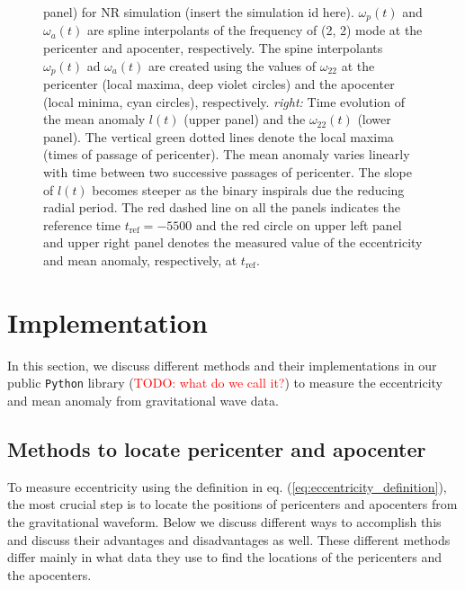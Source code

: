 \documentclass[aps,prd,amsmath,floats,floatfix, twocolumn,
superscriptaddress,nofootinbib,showpacs]{revtex4-1}
\newcommand{\red}{\textcolor{red}}
\newcommand{\TODO}[1]{\red{TODO: #1}}
\newcommand{\tref}{t_{\text{ref}}}
\begin{document}
\begin{figure}
{panel) for NR simulation (insert the simulation id here).
$\omega_p(t)$ and $\omega_a(t)$ are spline interpolants of the
frequency of (2, 2) mode at the pericenter and apocenter,
respectively. The spine interpolants $\omega_p(t)$ ad $\omega_a(t)$
are created using the values of $\omega_{22}$ at the pericenter (local
maxima, deep violet circles) and the apocenter (local minima, cyan
circles), respectively. {\itshape right:} Time evolution of the mean
anomaly $l(t)$ (upper panel) and the $\omega_{22}(t)$ (lower
panel). The vertical green dotted lines denote the local maxima (times
of passage of pericenter). The mean anomaly varies linearly with time
between two successive passages of pericenter. The slope of $l(t)$
becomes steeper as the binary inspirals due the reducing radial
period. The red dashed line on all the panels indicates the reference
time $\tref=-5500$ and the red circle on upper left panel and upper
right panel denotes the measured value of the eccentricity and mean
anomaly, respectively, at $\tref$.}
  \label{fig:ecc_definition}
\end{figure}

\section{Implementation}
\label{sec:implementation}
In this section, we discuss different methods and their
implementations in our public \texttt{Python} library (\TODO{what do
  we call it?}) to measure the eccentricity and mean anomaly from
gravitational wave data.

\subsection{Methods to locate pericenter and apocenter}
\label{sec:method-to-locate-pericenter-and-apocenter}
To measure eccentricity using the definition in
eq. (\ref{eq:eccentricity_definition}), the most crucial step is to
locate the positions of pericenters and apocenters from the
gravitational waveform. Below we discuss different ways to accomplish
this and discuss their advantages and disadvantages as well. These
different methods differ mainly in what data they use to
find the locations of the pericenters and the apocenters.
\end{document}
